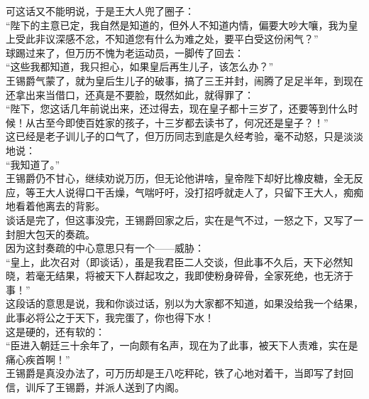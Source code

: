 \begin{multicols}{\theparacolNo}
可这话又不能明说，于是王大人兜了圈子：\\

“陛下的主意已定，我自然是知道的，但外人不知道内情，偏要大吵大嚷，我为皇上受此非议深感不忿，不知道您有什么为难之处，要平白受这份闲气？”\\

球踢过来了，但万历不愧为老运动员，一脚传了回去：\\

“这些我都知道，我只担心，如果皇后再生儿子，该怎么办？”\\

王锡爵气蒙了，就为皇后生儿子的破事，搞了三王并封，闹腾了足足半年，到现在还拿出来当借口，还真是不要脸，既然如此，就得罪了：\\

“陛下，您这话几年前说出来，还过得去，现在皇子都十三岁了，还要等到什么时候！从古至今即使百姓家的孩子，十三岁都去读书了，何况还是皇子？！”\\

这已经是老子训儿子的口气了，但万历同志到底是久经考验，毫不动怒，只是淡淡地说：\\

“我知道了。”\\

王锡爵仍不甘心，继续劝说万历，但无论他讲啥，皇帝陛下却好比橡皮糖，全无反应，等王大人说得口干舌燥，气喘吁吁，没打招呼就走人了，只留下王大人，痴痴地看着他离去的背影。\\

谈话是完了，但这事没完，王锡爵回家之后，实在是气不过，一怒之下，又写了一封胆大包天的奏疏。\\

因为这封奏疏的中心意思只有一个——威胁：\\

“皇上，此次召对（即谈话），虽是我君臣二人交谈，但此事不久后，天下必然知晓，若毫无结果，将被天下人群起攻之，我即使粉身碎骨，全家死绝，也无济于事！”\\

这段话的意思是说，我和你谈过话，别以为大家都不知道，如果没给我一个结果，此事必将公之于天下，我完蛋了，你也得下水！\\

这是硬的，还有软的：\\

“臣进入朝廷三十余年了，一向颇有名声，现在为了此事，被天下人责难，实在是痛心疾首啊！”\\

王锡爵是真没办法了，可万历却是王八吃秤砣，铁了心地对着干，当即写了封回信，训斥了王锡爵，并派人送到了内阁。\\


\end{multicols}
